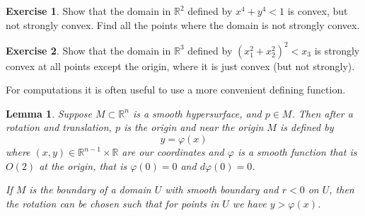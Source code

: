 \documentclass[12pt,openany]{book}
\newcommand{\R}{{\mathbb{R}}}
\theoremstyle{plain}
\newtheorem{lemma}[thm]{Lemma}
\theoremstyle{remark}
\theoremstyle{definition}
\newenvironment{exbox}{%
    \def\FrameCommand{\vrule width 1pt \relax\hspace {10pt}}%
    \MakeFramed {\advance \hsize -\width \FrameRestore }%
}{%
    \endMakeFramed
}
\theoremstyle{exercise}
\newtheorem{exercise}{Exercise}[section]
\theoremstyle{example}
\begin{document}
\begin{exbox}
\begin{exercise}
Show that the domain in $\R^2$ defined by $x^4+y^4 < 1$ is convex, but not strongly convex.
Find all the points where the domain is not strongly convex.
\end{exercise}

\begin{exercise}
Show that the domain in $\R^3$ defined by ${(x_1^2+x_2^2)}^2 < x_3$ is
strongly convex at all points except the origin, where it is just convex
(but not strongly).
\end{exercise}
\end{exbox}

For computations it is often useful to use a more convenient
defining function.

\begin{lemma} \label{lemma:realgraphcoords}
Suppose $M \subset \R^n$ is a smooth hypersurface, %
and $p \in M$.  Then after a rotation and translation, 
$p$ is the origin and near the origin $M$ is defined by
\begin{equation*}
y = \varphi(x)
\end{equation*}
where $(x,y) \in \R^{n-1} \times \R$ are our coordinates and
$\varphi$ is a smooth %
function that is $O(2)$ at the origin,
that is $\varphi(0) = 0$ and $d\varphi(0) = 0$.

If $M$ is the boundary of a domain $U$ with smooth boundary and
$r < 0$ on $U$,
then the rotation can be chosen
such that for points in $U$ we have $y > \varphi(x)$.
\end{lemma}


\begin{center}

\end{center}

\end{document}
